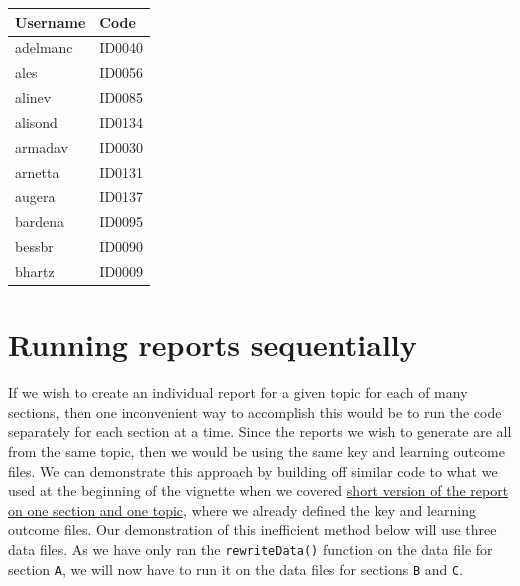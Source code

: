 \documentclass{article}\usepackage[]{graphicx}\usepackage[]{color}
\numberwithin{equation}{section} %
\begin{document}
\begin{center}
\label{tab:names}
\begin{tabular} { | l | l |}
\hline \textbf{Username} & \textbf{Code} \\
\hline
adelmanc & ID0040 \\
\hline
ales & ID0056 \\
\hline
alinev & ID0085 \\
\hline
alisond & ID0134 \\
\hline
armadav & ID0030 \\
\hline
arnetta & ID0131 \\
\hline
augera & ID0137 \\
\hline
bardena & ID0095 \\
\hline
bessbr & ID0090 \\
\hline
bhartz & ID0009 \\
\hline
\end{tabular}
\end{center}

\section{Running reports sequentially}
\label{sec:sequential}

If we wish to create an individual report for a given topic for each of many sections, then one inconvenient way to accomplish this would be to run the code separately for each section at a time. Since the reports we wish to generate are all from the same topic, then we would be using the same key and learning outcome files. We can demonstrate this approach by building off similar code to what we used at the beginning of the vignette when we covered \hyperref[sec:codeOnce]{short version of the report on one section and one topic}, where we already defined the key and learning outcome files. Our demonstration of this inefficient method below will use three data files. As we have only ran the \texttt{rewriteData()} function on the data file for section \texttt{A}, we will now have to run it on the data files for sections \texttt{B} and \texttt{C}. \\
\end{document}
